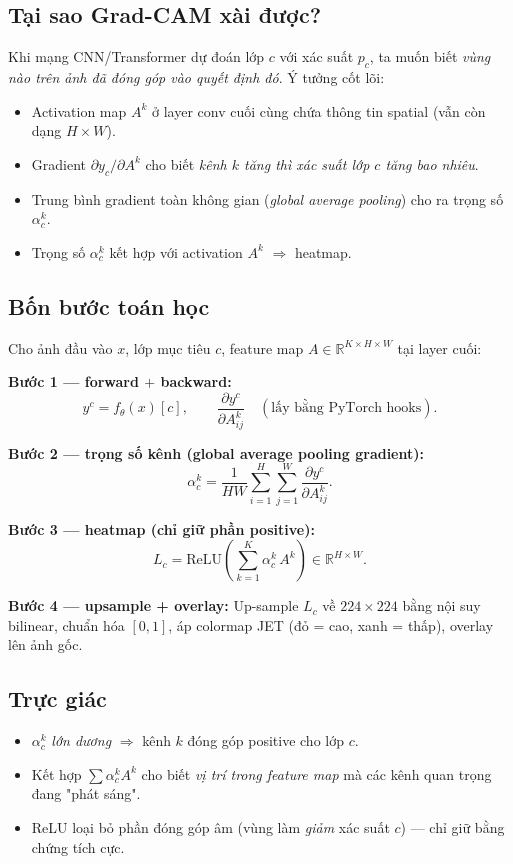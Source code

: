 \documentclass[11pt,a4paper]{article}
\begin{document}
\subsection{Tại sao Grad-CAM xài được?}

Khi mạng CNN/Transformer dự đoán lớp $c$ với xác suất $p_c$, ta muốn biết \textit{vùng nào trên ảnh đã đóng góp vào quyết định đó}. Ý tưởng cốt lõi:
\begin{itemize}[leftmargin=*]
  \item Activation map $A^k$ ở layer conv cuối cùng chứa thông tin spatial (vẫn còn dạng $H \times W$).
  \item Gradient $\partial y_c / \partial A^k$ cho biết \textit{kênh $k$ tăng thì xác suất lớp $c$ tăng bao nhiêu}.
  \item Trung bình gradient toàn không gian (\textit{global average pooling}) cho ra trọng số $\alpha_c^k$.
  \item Trọng số $\alpha_c^k$ kết hợp với activation $A^k$ $\Rightarrow$ heatmap.
\end{itemize}

\subsection{Bốn bước toán học}

Cho ảnh đầu vào $x$, lớp mục tiêu $c$, feature map $A \in \mathbb{R}^{K \times H \times W}$ tại layer cuối:

\textbf{Bước 1 --- forward $+$ backward:}
\[
  y^c = f_\theta(x)[c], \qquad \frac{\partial y^c}{\partial A^k_{ij}} \quad (\text{lấy bằng PyTorch hooks}).
\]

\textbf{Bước 2 --- trọng số kênh (global average pooling gradient):}
\[
  \alpha_c^k = \frac{1}{HW} \sum_{i=1}^H \sum_{j=1}^W \frac{\partial y^c}{\partial A^k_{ij}}.
\]

\textbf{Bước 3 --- heatmap (chỉ giữ phần positive):}
\[
  L_c = \mathrm{ReLU}\left( \sum_{k=1}^K \alpha_c^k \, A^k \right) \in \mathbb{R}^{H \times W}.
\]

\textbf{Bước 4 --- upsample + overlay:} Up-sample $L_c$ về $224 \times 224$ bằng nội suy bilinear, chuẩn hóa $[0, 1]$, áp colormap JET (đỏ = cao, xanh = thấp), overlay lên ảnh gốc.

\subsection{Trực giác}

\begin{itemize}[leftmargin=*]
  \item $\alpha_c^k$ \textit{lớn dương} $\Rightarrow$ kênh $k$ đóng góp positive cho lớp $c$.
  \item Kết hợp $\sum \alpha_c^k A^k$ cho biết \textit{vị trí trong feature map} mà các kênh quan trọng đang "phát sáng".
  \item ReLU loại bỏ phần đóng góp âm (vùng làm \textit{giảm} xác suất $c$) --- chỉ giữ bằng chứng tích cực.
\end{itemize}
\end{document}
